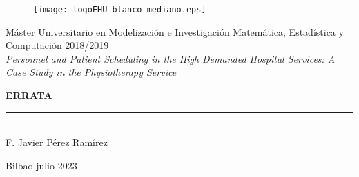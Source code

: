\documentclass[a4paper,12pt]{article}
\begin{document}
\begin{titlepage}
	\begin{sffamily}
		\color{NavyBlue}
		\begin{center}
			\begin{figure}[htb]
				\begin{center}
					\vspace*{0.6cm}
					\texttt{[image: logoEHU\_blanco\_mediano.eps]}
					\vspace*{1.6cm}
				\end{center}
			\end{figure}
			\begin{LARGE}
				Máster Universitario en Modelización e Investigación Matemática, Estadística y Computación 
				2018/2019 \\%
				\vspace*{1cm}
				\textsl{Personnel and Patient Scheduling in the High Demanded
					Hospital Services: A Case Study in the Physiotherapy Service}\\
			\end{LARGE}
			\Huge{\textbf{ERRATA}}\\ %
			\vspace*{1cm}
			\rule{80mm}{0.1mm}\\
			\huge{F. Javier Pérez Ramírez}\\ %
			\vspace*{0.5cm}
			\begin{Large}
				Bilbao julio 2023\\
			\end{Large}
		\end{center}
	\end{sffamily}
\end{titlepage}

\pagestyle{fancy}
\fancyhead{} %
\setlength\headheight{21.2pt}

\renewcommand{\tablename}{\textbf{Tabla}} %
\renewcommand{\figurename}{\textbf{Figura}} %
\renewcommand{\listtablename}{Índice de tablas}

\title{}
\date{}
\maketitle
\end{document}
